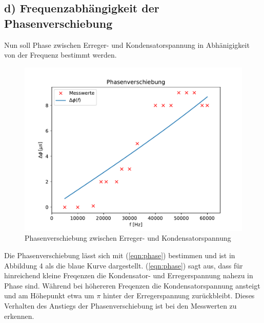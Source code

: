 \subsection{d) Frequenzabhängigkeit der Phasenverschiebung}
        Nun soll Phase zwischen Erreger- und Kondensatorspannung in Abhänigigkeit von der Frequenz bestimmt werden.
        \begin{figure}[H]
            \label{fig:phase}
            \includegraphics{Phasenverschiebung.pdf}
            \caption{Phasenverschiebung zwischen Erreger- und Kondensatorspannung}
        \end{figure}
        Die Phasenverschiebung lässt sich mit (\ref{eqn:phase}) bestimmen und ist in Abbildung 4 als die blaue Kurve dargestellt. (\ref{eqn:phase}) sagt aus, dass für hinreichend kleine Freqenzen die Kondensator- und Erregerspannung nahezu in Phase sind. Während bei höhereren Freqenzen die Kondensatorspannung ansteigt und am Höhepunkt etwa um $\pi$ hinter der Erregerspannung zurückbleibt. Dieses Verhalten des Anstiegs der Phasenverschiebung ist bei den Messwerten zu erkennen.
